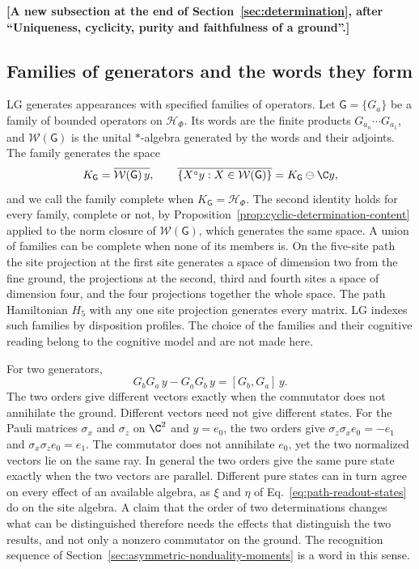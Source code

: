 \par\medskip\noindent\textbf{[A new subsection at the end of Section~\ref{sec:determination}, after ``Uniqueness, cyclicity, purity and faithfulness of a ground''.]}\par\smallskip

\subsection{Families of generators and the words they form}
\label{subsec:generator-families}

LG generates appearances with specified families of operators. Let $\mathsf G=\{G_a\}$ be a family of bounded operators on $\mathcal H_\Phi$. Its words are the finite products $G_{a_n}\cdots G_{a_1}$, and $\mathcal W(\mathsf G)$ is the unital $*$-algebra generated by the words and their adjoints. The family generates the space
\begin{equation}
 K_{\mathsf G}=\overline{\mathcal W(\mathsf G)\,y},\qquad
 \overline{\{X^\circ y:X\in\mathcal W(\mathsf G)\}}=K_{\mathsf G}\ominus\C y ,
 \label{eq:family-generated-space}
\end{equation}
and we call the family complete when $K_{\mathsf G}=\mathcal H_\Phi$. The second identity holds for every family, complete or not, by Proposition~\ref{prop:cyclic-determination-content} applied to the norm closure of $\mathcal W(\mathsf G)$, which generates the same space. A union of families can be complete when none of its members is. On the five-site path the site projection at the first site generates a space of dimension two from the fine ground, the projections at the second, third and fourth sites a space of dimension four, and the four projections together the whole space. The path Hamiltonian $H_5$ with any one site projection generates every matrix. LG indexes such families by disposition profiles. The choice of the families and their cognitive reading belong to the cognitive model and are not made here.

For two generators,
\begin{equation}
 G_bG_a\,y-G_aG_b\,y=[G_b,G_a]\,y .
 \label{eq:word-order}
\end{equation}
The two orders give different vectors exactly when the commutator does not annihilate the ground. Different vectors need not give different states. For the Pauli matrices $\sigma_x$ and $\sigma_z$ on $\C^2$ and $y=e_0$, the two orders give $\sigma_z\sigma_xe_0=-e_1$ and $\sigma_x\sigma_ze_0=e_1$. The commutator does not annihilate $e_0$, yet the two normalized vectors lie on the same ray. In general the two orders give the same pure state exactly when the two vectors are parallel. Different pure states can in turn agree on every effect of an available algebra, as $\xi$ and $\eta$ of Eq.~\eqref{eq:path-readout-states} do on the site algebra. A claim that the order of two determinations changes what can be distinguished therefore needs the effects that distinguish the two results, and not only a nonzero commutator on the ground. The recognition sequence of Section~\ref{sec:asymmetric-nonduality-moments} is a word in this sense.

